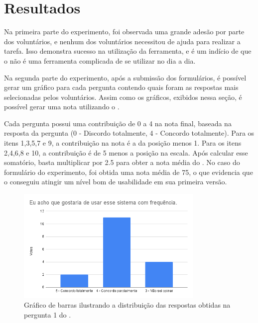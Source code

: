 \documentclass[12pt]{tcc}
\begin{document}
	\section{Resultados}
	\label{section:resultados}

	Na primeira parte do experimento, foi observada uma grande adesão por parte dos voluntários, e nenhum dos voluntários necessitou de ajuda para realizar a tarefa. Isso demonstra sucesso na utilização da ferramenta, e é um indício de que o  não é uma ferramenta complicada de se utilizar no dia a dia.

	Na segunda parte do experimento, após a submissão dos formulários, é possível gerar um gráfico para cada pergunta contendo quais foram as respostas mais selecionadas pelos voluntários. Assim como os gráficos, exibidos nessa seção, é possível gerar uma nota utilizando o .

	Cada pergunta possui uma contribuição de 0 a 4 na nota final, baseada na resposta da pergunta (0 - Discordo totalmente, 4 - Concordo totalmente). Para os itens 1,3,5,7 e 9, a contribuição na nota é a da posição menos 1. Para os itens 2,4,6,8 e 10, a contribuição é de 5 menos a posição na escala. Após calcular esse somatório, basta multiplicar por 2.5 para obter a nota média do  \citep{brooke1995sus}. No caso do formulário do experimento, foi obtida uma nota média de 75, o que evidencia que o  conseguiu atingir um nível bom de usabilidade em sua primeira versão.




	\begin{figure}[!ht]
		\centering
		\includegraphics[width=0.8\textwidth]{figures/respostas-pergunta-1.png}
		\caption{Gráfico de barras ilustrando a distribuição das respostas obtidas na pergunta 1 do .}
		\label{fig:respostas-pergunta-1}
	\end{figure}
\end{document}
